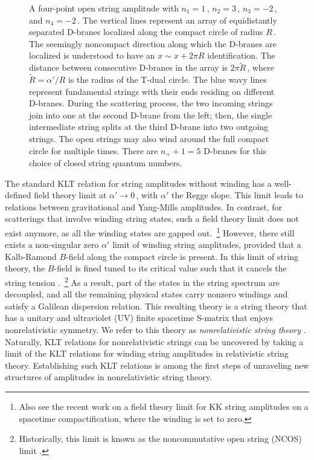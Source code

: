 \documentclass[11pt]{article}
\renewcommand{\tilde}[1]{\widetilde{#1}}
\begin{document}
\begin{figure}[t!]
%
%
\caption{A four-point open string amplitude with $n_1 = 1$\,, $n_2 = 3$\,, $n_3 = -2$\,, and $n_4 = -2$\,. The vertical lines represent an array of equidistantly separated D-branes localized along the compact circle of radius $R$\,. The seemingly noncompact direction along which the D-branes are localized is understood to have an $x \sim x + 2 \pi R$ identification.
The distance between consecutive D-branes in the array is $2\pi\tilde{R}$\,, where $\tilde{R} = \alpha' / R$ is the radius of the T-dual circle. The blue wavy lines represent fundamental strings with their ends residing on different D-branes. During the scattering process, the two incoming strings join into one at the second D-brane from the left; then, the single intermediate string splits at the third D-brane into two outgoing strings. The open strings may also wind around the full compact circle for multiple times. There are $n_+ + 1 = 5$ D-branes for this choice of closed string quantum numbers.}
\label{fig:osamp}
\end{figure}

The standard KLT relation for string amplitudes without winding has a well-defined field theory limit at $\alpha' \rightarrow 0$\,, with $\alpha'$ the Regge slope. This limit leads to relations between gravitational and Yang-Mills amplitudes. In contrast, for scatterings that involve winding string states, such a field theory limit does not exist anymore, as all the winding states are gapped out.~\footnote{Also see the recent work \cite{Li:2021yfk} on a field theory limit for KK string amplitudes on a spacetime compactification, where the winding is set to zero.} However, there still exists a non-singular zero $\alpha'$ limit of winding string amplitudes, provided that a Kalb-Ramond $B$-field along the compact circle is present. In this limit of string theory, the $B$-field is fined tuned to its critical value such that it cancels the string tension \cite{Klebanov:2000pp, Gomis:2000bd, Danielsson:2000gi}.~\footnote{Historically, this limit is known as the noncommutative open string (NCOS) limit \cite{Seiberg:2000ms,Gopakumar:2000na}.} As a result, part of the states in the string spectrum are decoupled, and all the remaining physical states carry nonzero windings and satisfy a Galilean dispersion relation. This resulting theory is a string theory that has a unitary and ultraviolet (UV) finite spacetime S-matrix that enjoys nonrelativistic symmetry. We refer to this theory as \emph{nonrelativistic string theory} \cite{Gomis:2000bd}. Naturally, KLT relations for nonrelativistic strings can be uncovered by taking a limit of the KLT relations for winding string amplitudes in relativistic string theory. Establishing such KLT relations is among the first steps of unraveling new structures of amplitudes in nonrelativistic string theory. 
\end{document}
